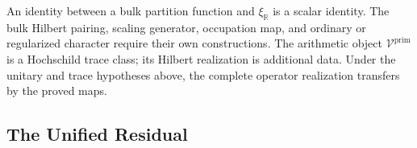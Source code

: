 \begin{remark}
\label{v4-arith:w9-r4:rem:acs-wilson}
An identity between a bulk partition function and $\xi_{\mathbb R}$
is a scalar identity. The bulk Hilbert pairing, scaling generator,
occupation map, and ordinary or regularized character require
their own constructions. The arithmetic object
$\mathcal V^{\mathrm{prim}}$ is a Hochschild trace class; its Hilbert
realization is additional data. Under the unitary and trace hypotheses
above, the complete operator realization transfers by the proved maps.
\end{remark}

\subsection{The Unified Residual}
\label{v4-arith:w9-r4:placement:unified}

